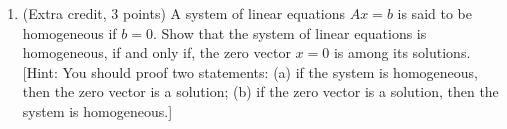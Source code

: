 \documentclass[fleqn]{article}
\begin{document}
\begin{enumerate}
    \item (Extra credit, 3 points) A system of linear equations $Ax=b$ is said to be homogeneous if
    $b=0$. Show that the system of linear equations is homogeneous, if and only if, the zero
    vector $x=0$ is among its solutions.
    [Hint: You should proof two statements: (a) if the system is homogeneous, 
    then the zero vector is a solution; (b) if the zero vector is a solution,
    then the system is homogeneous.]
  
  \end{enumerate}
\end{document}
